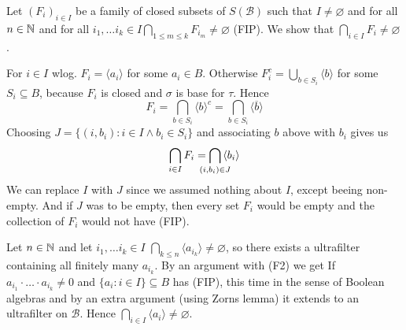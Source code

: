 {\begin{enumerate}[label=(\roman*)]
\begin{claimproof}
            Let $(F_i)_{i\in I}$ be a family of closed subsets of $S(\mathcal{B})$ such that $I\neq  \varnothing$ and for all $n\in \mathbb{N}$ and for all $ i_1, \dots i_k\in I \bigcap_{1\leq m\leq k}F_{i_m}\neq \varnothing$ (FIP). We show that $\bigcap_{i\in I}F_i \neq \varnothing$. 
            
            For $i\in I$ wlog. $F_i = \langle a_i \rangle$ for some $a_i\in B$.
            Otherwise $F_i^c = \bigcup_{b\in S_i}\langle b \rangle$ for some $S_i\subseteq B$, 
            because $F_i$ is closed and $\sigma$ is base for $\tau$. Hence 
            $$F_i = \bigcap_{b\in S_i}\langle b \rangle^c= \bigcap_{b\in S_i}\langle \overline{b} \rangle$$
            Choosing $J = \{(i,b_i) : i\in I\land b_i\in S_i\}$ and associating $b$ above with $b_i$ gives us 
            \[\bigcap_{i\in I}F_i =\smashoperator{\bigcap_{(i,b_i)\in J}}{\langle b_i\rangle }\]
            We can replace $I$ with $J$ since we assumed nothing about $I$, except beeing non-empty. And if $J$ was to be empty, then every set $F_i$ would be empty and the collection of $F_i$ would not have (FIP).
            
            Let $n\in \mathbb{N}$ and let $ i_1, \dots i_k\in I $
            $\bigcap_{k\leq n}\langle a_{i_k}\rangle \neq \varnothing$, so there exists a ultrafilter containing all finitely many $a_{i_k}$. By an argument with (F2) we get
            If $a_{i_1}\cdot \ldots \cdot a_{i_k} \neq 0$ and $\{a_i : i\in I\}\subseteq B$ has (FIP),
            this time in the sense of Boolean algebras and by an extra argument (using Zorns lemma) it extends to an ultrafilter on $\mathcal{B}$. Hence $\bigcap_{i\in I}\langle a_i \rangle \neq \varnothing$.
        \end{claimproof}        
    \end{enumerate}
}


